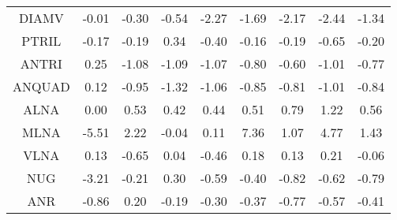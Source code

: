 \begin{longtable}{ | c || c | c | c | c | c | c | c || c |}
DIAMV &  \cellcolor[HTML]{FFFFFF} -0.01 &  \cellcolor[HTML]{FFF7F7} -0.30 &  \cellcolor[HTML]{FFEFEF} -0.54 &  \cellcolor[HTML]{FFC7C7} -2.27 &  \cellcolor[HTML]{FFD7D7} -1.69 &  \cellcolor[HTML]{FFC7C7} -2.17 &  \cellcolor[HTML]{FFBFBF} -2.44 &  \cellcolor[HTML]{FFDFDF} -1.34 \\
PTRIL &  \cellcolor[HTML]{FFF7F7} -0.17 &  \cellcolor[HTML]{FFF7F7} -0.19 &  \cellcolor[HTML]{F7F7FF} 0.34 &  \cellcolor[HTML]{FFF7F7} -0.40 &  \cellcolor[HTML]{FFFFFF} -0.16 &  \cellcolor[HTML]{FFF7F7} -0.19 &  \cellcolor[HTML]{FFEFEF} -0.65 &  \cellcolor[HTML]{FFF7F7} -0.20 \\
ANTRI &  \cellcolor[HTML]{F7F7FF} 0.25 &  \cellcolor[HTML]{FFE7E7} -1.08 &  \cellcolor[HTML]{FFE7E7} -1.09 &  \cellcolor[HTML]{FFE7E7} -1.07 &  \cellcolor[HTML]{FFE7E7} -0.80 &  \cellcolor[HTML]{FFEFEF} -0.60 &  \cellcolor[HTML]{FFE7E7} -1.01 &  \cellcolor[HTML]{FFEFEF} -0.77 \\
ANQUAD &  \cellcolor[HTML]{FFFFFF} 0.12 &  \cellcolor[HTML]{FFE7E7} -0.95 &  \cellcolor[HTML]{FFDFDF} -1.32 &  \cellcolor[HTML]{FFE7E7} -1.06 &  \cellcolor[HTML]{FFE7E7} -0.85 &  \cellcolor[HTML]{FFE7E7} -0.81 &  \cellcolor[HTML]{FFE7E7} -1.01 &  \cellcolor[HTML]{FFE7E7} -0.84 \\
ALNA &  \cellcolor[HTML]{FFFFFF} 0.00 &  \cellcolor[HTML]{EFEFFF} 0.53 &  \cellcolor[HTML]{F7F7FF} 0.42 &  \cellcolor[HTML]{F7F7FF} 0.44 &  \cellcolor[HTML]{EFEFFF} 0.51 &  \cellcolor[HTML]{E7E7FF} 0.79 &  \cellcolor[HTML]{DFDFFF} 1.22 &  \cellcolor[HTML]{EFEFFF} 0.56 \\
MLNA &  \cellcolor[HTML]{FF7878} -5.51 &  \cellcolor[HTML]{C7C7FF} 2.22 &  \cellcolor[HTML]{FFFFFF} -0.04 &  \cellcolor[HTML]{FFFFFF} 0.11 &  \cellcolor[HTML]{4848FF} 7.36 &  \cellcolor[HTML]{E7E7FF} 1.07 &  \cellcolor[HTML]{8787FF} 4.77 &  \cellcolor[HTML]{DFDFFF} 1.43 \\
VLNA &  \cellcolor[HTML]{FFFFFF} 0.13 &  \cellcolor[HTML]{FFEFEF} -0.65 &  \cellcolor[HTML]{FFFFFF} 0.04 &  \cellcolor[HTML]{FFF7F7} -0.46 &  \cellcolor[HTML]{F7F7FF} 0.18 &  \cellcolor[HTML]{FFFFFF} 0.13 &  \cellcolor[HTML]{F7F7FF} 0.21 &  \cellcolor[HTML]{FFFFFF} -0.06 \\
NUG &  \cellcolor[HTML]{FFAFAF} -3.21 &  \cellcolor[HTML]{FFF7F7} -0.21 &  \cellcolor[HTML]{F7F7FF} 0.30 &  \cellcolor[HTML]{FFEFEF} -0.59 &  \cellcolor[HTML]{FFF7F7} -0.40 &  \cellcolor[HTML]{FFE7E7} -0.82 &  \cellcolor[HTML]{FFEFEF} -0.62 &  \cellcolor[HTML]{FFE7E7} -0.79 \\
ANR &  \cellcolor[HTML]{FFE7E7} -0.86 &  \cellcolor[HTML]{F7F7FF} 0.20 &  \cellcolor[HTML]{FFF7F7} -0.19 &  \cellcolor[HTML]{FFF7F7} -0.30 &  \cellcolor[HTML]{FFF7F7} -0.37 &  \cellcolor[HTML]{FFEFEF} -0.77 &  \cellcolor[HTML]{FFEFEF} -0.57 &  \cellcolor[HTML]{FFF7F7} -0.41 \\

\end{longtable}
